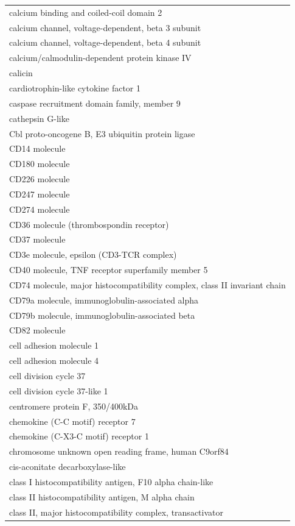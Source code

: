 \documentclass[english]{article}\usepackage[]{graphicx}\usepackage[]{color}
\begin{document}
\begin{longtable}{l}
calcium binding and coiled-coil domain 2 \\ 
calcium channel, voltage-dependent, beta 3 subunit \\ 
calcium channel, voltage-dependent, beta 4 subunit \\ 
calcium/calmodulin-dependent protein kinase IV \\ 
calicin \\ 
cardiotrophin-like cytokine factor 1 \\ 
caspase recruitment domain family, member 9 \\ 
cathepsin G-like \\ 
Cbl proto-oncogene B, E3 ubiquitin protein ligase \\ 
CD14 molecule \\ 
CD180 molecule \\ 
CD226 molecule \\ 
CD247 molecule \\ 
CD274 molecule \\ 
CD36 molecule (thrombospondin receptor) \\ 
CD37 molecule \\ 
CD3e molecule, epsilon (CD3-TCR complex) \\ 
CD40 molecule, TNF receptor superfamily member 5 \\ 
CD74 molecule, major histocompatibility complex, class II invariant chain \\ 
CD79a molecule, immunoglobulin-associated alpha \\ 
CD79b molecule, immunoglobulin-associated beta \\ 
CD82 molecule \\ 
cell adhesion molecule 1 \\ 
cell adhesion molecule 4 \\ 
cell division cycle 37 \\ 
cell division cycle 37-like 1 \\ 
centromere protein F, 350/400kDa \\ 
chemokine (C-C motif) receptor 7 \\ 
chemokine (C-X3-C motif) receptor 1 \\ 
chromosome unknown open reading frame, human C9orf84 \\ 
cis-aconitate decarboxylase-like \\ 
class I histocompatibility antigen, F10 alpha chain-like \\ 
class II histocompatibility antigen, M alpha chain \\ 
class II, major histocompatibility complex, transactivator \\ 

\end{longtable}
\end{document}
